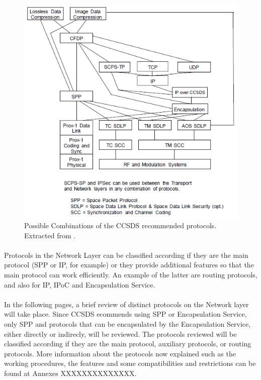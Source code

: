 \begin{figure}[H]
\begin{center}
\includegraphics[scale=1]{CCSDScombinations.PNG}
\caption[Combination of CCSDS Recommended Protocols]{Possible Combinations of the CCSDS recommended protocols. Extracted from \cite{CCSDSOverview}.}
\label{fig:CCSDScombinations}
\end{center}
\end{figure}
\paragraph{}Protocols in the Network Layer can be classified according if they are the main protocol (SPP or IP, for example) or they provide additional features so that the main protocol can work efficiently. An example of the latter are routing protocols, and also for IP, IPoC and Encapsulation Service.
\paragraph{}In the following pages, a brief review of distinct protocols on the Network layer will take place. Since CCSDS ecommends using SPP or Encapsulation Service, only SPP and protocols that can be encapsulated by the Encapsulation Service, either directly or indirecly, will be reviewed. The protocols reviewed will be classified according if they are the main protocol, auxiliary protocols, or routing protocols. More information about the protocols now explained such as the working procedures, the features and some compatibilities and restrictions can be found at Annexes XXXXXXXXXXXXXX.

